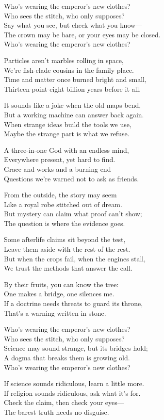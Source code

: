 \begin{lyrics}
Who’s wearing the emperor’s new clothes?\\
Who sees the stitch, who only supposes?\\
Say what you see, but check what you know—\\
The crown may be bare, or your eyes may be closed.\\
Who’s wearing the emperor’s new clothes?

Particles aren’t marbles rolling in space,\\
We’re fish-clade cousins in the family place.\\
Time and matter once burned bright and small,\\
Thirteen-point-eight billion years before it all.

It sounds like a joke when the old maps bend,\\
But a working machine can answer back again.\\
When strange ideas build the tools we use,\\
Maybe the strange part is what we refuse.

A three-in-one God with an endless mind,\\
Everywhere present, yet hard to find.\\
Grace and works and a burning end—\\
Questions we’re warned not to ask as friends.

From the outside, the story may seem\\
Like a royal robe stitched out of dream.\\
But mystery can claim what proof can’t show;\\
The question is where the evidence goes.

Some afterlife claims sit beyond the test,\\
Leave them aside with the rest of the rest.\\
But when the crops fail, when the engines stall,\\
We trust the methods that answer the call.

By their fruits, you can know the tree:\\
One makes a bridge, one silences me.\\
If a doctrine needs threats to guard its throne,\\
That’s a warning written in stone.

Who’s wearing the emperor’s new clothes?\\
Who sees the stitch, who only supposes?\\
Science may sound strange, but its bridges hold;\\
A dogma that breaks them is growing old.\\
Who’s wearing the emperor’s new clothes?

If science sounds ridiculous, learn a little more.\\
If religion sounds ridiculous, ask what it’s for.\\
Check the claim, then check your eyes—\\
The barest truth needs no disguise.
\end{lyrics}

